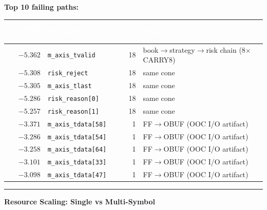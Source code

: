 \documentclass[10pt,a4paper]{article}
\newcommand{\sectionrule}{\vspace{2pt}\textcolor{rulegray}{\rule{\linewidth}{0.8pt}}\vspace{2pt}}
\begin{document}
\vspace{6pt}
\textbf{\color{accentteal} Top 10 failing paths:}
\begin{center}
\small\renewcommand{\arraystretch}{1.15}
\begin{tabular}{@{}r l r l@{}}
\toprule
\rowcolor{hdrblue}
\textcolor{white}{\textbf{Slack (ns)}} &
\textcolor{white}{\textbf{Destination}} &
\textcolor{white}{\textbf{Levels}} &
\textcolor{white}{\textbf{Type}} \\
\midrule
\rowcolor{failrowbg}$-5.362$ & \texttt{m\_axis\_tvalid}    & 18 & book$\to$strategy$\to$risk chain (8$\times$CARRY8) \\
\rowcolor{failrowbg}$-5.308$ & \texttt{risk\_reject}       & 18 & same cone \\
\rowcolor{failrowbg}$-5.305$ & \texttt{m\_axis\_tlast}     & 18 & same cone \\
\rowcolor{failrowbg}$-5.286$ & \texttt{risk\_reason[0]}    & 18 & same cone \\
\rowcolor{failrowbg}$-5.257$ & \texttt{risk\_reason[1]}    & 18 & same cone \\
\rowcolor{pendrowbg}$-3.371$ & \texttt{m\_axis\_tdata[58]} &  1 & FF$\to$OBUF (OOC I/O artifact) \\
\rowcolor{pendrowbg}$-3.286$ & \texttt{m\_axis\_tdata[54]} &  1 & FF$\to$OBUF (OOC I/O artifact) \\
\rowcolor{pendrowbg}$-3.258$ & \texttt{m\_axis\_tdata[64]} &  1 & FF$\to$OBUF (OOC I/O artifact) \\
\rowcolor{pendrowbg}$-3.101$ & \texttt{m\_axis\_tdata[33]} &  1 & FF$\to$OBUF (OOC I/O artifact) \\
\rowcolor{pendrowbg}$-3.098$ & \texttt{m\_axis\_tdata[47]} &  1 & FF$\to$OBUF (OOC I/O artifact) \\
\bottomrule
\end{tabular}
\end{center}

\sectionrule

{\large\bfseries\color{hdrblue} Resource Scaling: Single vs Multi-Symbol}
\end{document}
